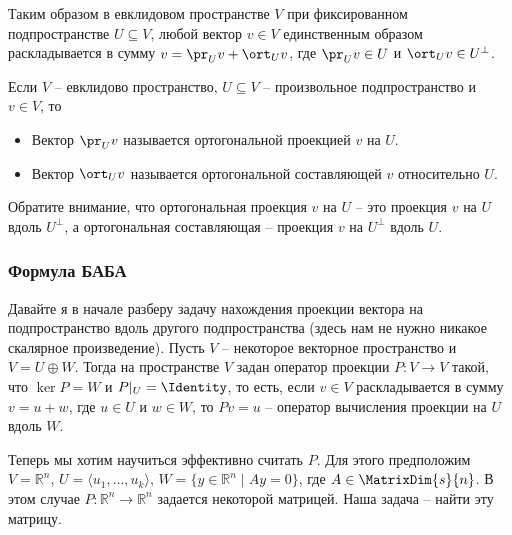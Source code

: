 Таким образом в евклидовом пространстве $V$ при фиксированном подпространстве $U\subseteq V$, любой вектор $v\in V$ единственным образом раскладывается в сумму $v = \pr_U v + \ort_U v$, где $\pr_U v \in U$ и $\ort_U v\in U^\bot$.


\begin{definition}
Если $V$ -- евклидово пространство, $U\subseteq V$ -- произвольное подпространство и $v\in V$, то 
\begin{itemize}
\item Вектор $\pr_U v$ называется ортогональной проекцией $v$ на $U$.

\item Вектор $\ort_U v$ называется ортогональной составляющей $v$ относительно $U$.
\end{itemize}
\end{definition}

Обратите внимание, что ортогональная проекция $v$ на $U$ -- это проекция $v$ на $U$ вдоль $U^\bot$, а ортогональная составляющая -- проекция $v$ на $U^\bot$ вдоль $U$.

\subsubsection*{Формула БАБА}

Давайте я в начале разберу задачу нахождения проекции вектора на подпространство вдоль другого подпространства (здесь нам не нужно никакое скалярное произведение).
Пусть $V$ -- некоторое векторное пространство и $V = U\oplus W$.
Тогда на пространстве $V$ задан оператор проекции $P\colon V\to V$ такой, что $\ker P = W$ и $P|_U = \Identity$, то есть, если $v\in V$ раскладывается в сумму $v = u + w$, где $u\in U$ и $w\in W$, то $Pv = u$ -- оператор вычисления проекции на $U$ вдоль $W$.


Теперь мы хотим научиться эффективно считать $P$.
Для этого предположим $V = \mathbb R^n$, $U = \langle u_1,\ldots,u_k\rangle$, $W = \{y\in \mathbb R^n\mid Ay = 0\}$, где $A\in \MatrixDim{s}{n}$.
В этом случае $P\colon \mathbb R^n\to \mathbb R^n$ задается некоторой матрицей.
Наша задача -- найти эту матрицу.

